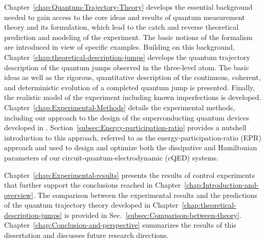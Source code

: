 Chapter~\ref{chap:Quantum-Trajectory-Theory} develops the essential
background needed to gain access to the core ideas and results of
quantum measurement theory and its formulation, which lead to the
catch and reverse theoretical prediction and modeling of the experiment.
The basic notions of the formalism are introduced in view of specific
examples. Building on this background, Chapter~\ref{chap:theoretical-description-jumps}
develops the quantum trajectory description of the quantum jumps observed
in the three-level atom. The basic ideas as well as the rigorous,
quantitative description of the continuous, coherent, and deterministic
evolution of a completed quantum jump is presented. Finally, the realistic
model of the experiment including known imperfections is developed.
 Chapter~\ref{chap:Experimental-Methods} details the experimental
methods, including our approach to the design of the superconducting
quantum devices developed in \citet{Minev2018-EPR}. Section~\ref{subsec:Energy-participation-ratio}
provides a nutshell introduction to this approach, referred to as
the energy-participation-ratio (EPR) approach and used to design and
optimize both the dissipative and Hamiltonian parameters of our circuit-quantum-electrodynamic
(cQED) systems.

Chapter~\ref{chap:Experimental-results} presents the results of
control experiments that further support the conclusions reached in
Chapter~\ref{chap:Introduction-and-overview}. The comparison between
the experimental results and the predictions of the quantum trajectory
theory developed in Chapter~\ref{chap:theoretical-description-jumps}
is provided in Sec.~\ref{subsec:Comparison-between-theory}. Chapter~\ref{chap:Conclusion-and-perspective}
summarizes the results of this dissertation  and discusses future
research directions. 

